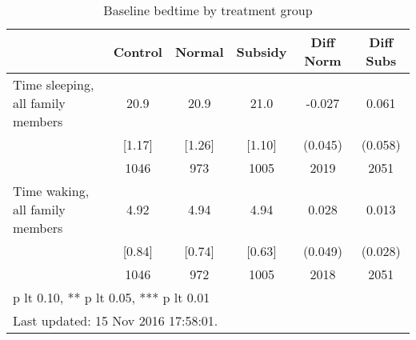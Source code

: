 \begin{table}[htbp]\centering
\def\sym#1{\ifmmode^{#1}\else\(^{#1}\)\fi}
\caption{Baseline bedtime by treatment group \label{tab:"balance"}}
\begin{tabular*}{0.9\hsize}{@{\hskip\tabcolsep\extracolsep\fill}l*{1}{ccccc}}
\toprule
                                &  Control&   Normal&  Subsidy&Diff Norm         &Diff Subs         \\
\midrule
Time sleeping, all family members&     20.9&     20.9&     21.0&   -0.027         &    0.061         \\
                                &   [1.17]&   [1.26]&   [1.10]&  (0.045)         &  (0.058)         \\
                                &     1046&      973&     1005&     2019         &     2051         \\
Time waking, all family members &     4.92&     4.94&     4.94&    0.028         &    0.013         \\
                                &   [0.84]&   [0.74]&   [0.63]&  (0.049)         &  (0.028)         \\
                                &     1046&      972&     1005&     2018         &     2051         \\
\bottomrule
\multicolumn{6}{l}{\footnotesize * p lt 0.10, ** p lt 0.05, *** p lt 0.01}\\
\multicolumn{6}{l}{\footnotesize Last updated: 15 Nov 2016 17:58:01.}\\
\end{tabular*}
\end{table}
